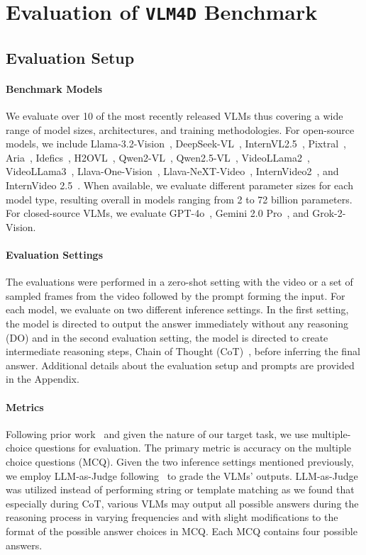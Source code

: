 \section{Evaluation of \texttt{VLM4D} Benchmark}


\subsection{Evaluation Setup}
\paragraph{Benchmark Models}
We evaluate over 10 of the most recently released VLMs thus covering a wide range of model sizes, architectures, and training methodologies. For open-source models, we include Llama-3.2-Vision~\cite{grattafiori2024llama}, DeepSeek-VL~\cite{lu2024deepseek}, InternVL2.5~\cite{chen2024expanding}, Pixtral~\cite{agrawal2024pixtral}, Aria~\cite{li2024aria}, Idefics~\cite{laurenccon2023obelics}, H2OVL~\cite{galib2024h2ovl}, Qwen2-VL~\cite{wang2024qwen2}, Qwen2.5-VL~\cite{yang2024qwen2}, VideoLLama2~\cite{cheng2024videollama}, VideoLLama3~\cite{zhang2025videollama}, Llava-One-Vision~\cite{li2024llava}, Llava-NeXT-Video~\cite{zhang2024llavanextvideo}, InternVideo2~\cite{wang2024internvideo2}, and InternVideo 2.5~\cite{wang2025internvideo2}. When available, we evaluate different parameter sizes for each model type, resulting overall in models ranging from 2 to 72 billion parameters. For closed-source VLMs, we evaluate GPT-4o~\cite{gpt4o}, Gemini 2.0 Pro~\cite{team2024gemini}, and Grok-2-Vision. 

\paragraph{Evaluation Settings}
The evaluations were performed in a zero-shot setting with the video or a set of sampled frames from the video followed by the prompt forming the input. For each model, we evaluate on two different inference settings. In the first setting, the model is directed to output the answer immediately without any reasoning (DO) and in the second evaluation setting, the model is directed to create intermediate reasoning steps, Chain of Thought (CoT)~\cite{wei2022chain}, before inferring the final answer. Additional details about the evaluation setup and prompts are provided in the Appendix.

\paragraph{Metrics} Following prior work~\cite{yang2024thinking} and given the nature of our target task, we use multiple-choice questions for evaluation. The primary metric is accuracy on the multiple choice questions (MCQ). Given the two inference settings mentioned previously, we employ LLM-as-Judge following~\cite{zhao2025mmvu} to grade the VLMs' outputs. LLM-as-Judge was utilized instead of performing string or template matching as we found that especially during CoT, various VLMs may output all possible answers during the reasoning process in varying frequencies and with slight modifications to the format of the possible answer choices in MCQ. Each MCQ contains four possible answers.


